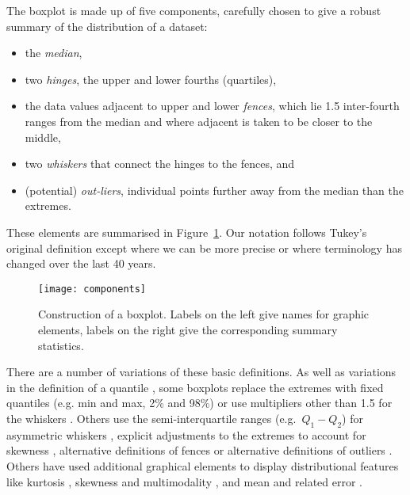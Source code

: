 \documentclass[oneside]{article}
\begin{document}
The boxplot is made up of five components, carefully chosen to give a robust summary of the distribution of a dataset:

\begin{itemize}

\item the \emph{median},

\item two \emph{hinges}, the upper and lower fourths (quartiles),

\item the data values adjacent to upper and lower \emph{fences}, which lie 1.5 inter-fourth ranges from the median and where adjacent is taken to be closer to the middle,

\item two \emph{whiskers} that connect the hinges to the fences, and

\item (potential) \emph{out-liers}, individual points further away from the median than the extremes.

\end{itemize}

\noindent These elements are summarised in Figure~\ref{fig:construction}. Our notation follows Tukey's original definition except where we can be more precise or where terminology has changed over the last 40 years. 

\begin{figure}[htbp]
  \centering
  \texttt{[image: components]}
  \caption{Construction of a boxplot.  Labels on the left give names for graphic elements, labels on the right give the corresponding summary statistics.}
  \label{fig:construction}
\end{figure}

There are a number of variations of these basic definitions. As well as variations in the definition of a quantile \citep{hyndman:1996}, some boxplots replace the extremes with fixed quantiles (e.g. min and max, 2\% and 98\%) or use multipliers other than 1.5 for the whiskers \citep{frigge:1989}. Others use the semi-interquartile ranges (e.g.\ $Q_1 - Q_2$) for asymmetric whiskers \citep{rousseuw:1999}, explicit adjustments to the extremes to account for skewness \citep{hubert:2008}, alternative definitions of fences \citep{dumbgen:2007} or alternative definitions of outliers \citep{schwertman:2004,carter:2009}. Others have used additional graphical elements to display distributional features like kurtosis \citep{aslam:1991}, skewness and multimodality \citep{choonpradub:2005}, and mean and related error \citep{marmolejo-ramos:2010}.
\end{document}
